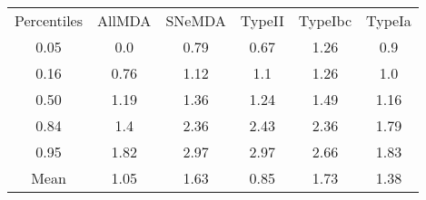 \begin{table}
\begin{tabular}{cccccc}
Percentiles & AllMDA & SNeMDA & TypeII & TypeIbc & TypeIa \\
0.05 & 0.0 & 0.79 & 0.67 & 1.26 & 0.9 \\
0.16 & 0.76 & 1.12 & 1.1 & 1.26 & 1.0 \\
0.50 & 1.19 & 1.36 & 1.24 & 1.49 & 1.16 \\
0.84 & 1.4 & 2.36 & 2.43 & 2.36 & 1.79 \\
0.95 & 1.82 & 2.97 & 2.97 & 2.66 & 1.83 \\
Mean & 1.05 & 1.63 & 0.85 & 1.73 & 1.38 \\
\end{tabular}
\end{table}

